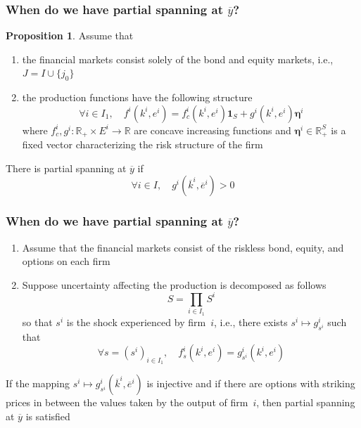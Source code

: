 \documentclass[blue]{beamer}
\def\R{\mathbb{R}}
\def\1{\mathbf{1}}
\theoremstyle{definition}
\theoremstyle{example}
\newtheorem*{proposition}{Proposition}
\begin{document}

\begin{frame}\frametitle{When do we have partial spanning at $\overline{y}$?}

\begin{proposition}
Assume that
\begin{enumerate}
\item the financial markets consist solely of the bond and equity markets, i.e., $J= I \cup \{j_0\}$
\item the production functions have the following structure
\[
\forall i\in I_1, \quad f^i(k^i,e^i) = f^i_c(k^i,e^i) \1_S + g^i(k^i,e^i) \bm{\eta}^i
\]
where $f^i_c,g^i: \R_+ \times E^i \to \R$ are concave increasing functions and $\bm{\eta}^i \in \R^S_+$ is a fixed vector characterizing the risk structure of the firm
\end{enumerate}
There is partial spanning at $\overline{y}$ if
\[
\forall i\in I, \quad g^i(\overline{k}^i,\overline{e}^i) >0
\]
\end{proposition}

\end{frame}


\begin{frame}\frametitle{When do we have partial spanning at $\overline{y}$?}

\begin{enumerate}
\item Assume that the financial markets consist of the riskless bond, equity, and options on each firm
\item Suppose uncertainty affecting the production is decomposed as follows
\[
S =\prod_{i\in I_1} S^i
\]
so that $s^i$ is the shock experienced by firm~$i$, i.e., there exists $s^i \mapsto g^i_{s^i}$ such that
\[
\forall s=(s^i)_{i\in I_1}, \quad f^i_s(k^i,e^i) = g^i_{s^i}(k^i,e^i)
\]
\end{enumerate}
If the mapping $s^i \mapsto g^i_{s^i}(\overline{k}^i,\overline{e}^i)$ is injective and if there are options with striking prices in between the values taken by the output of firm~$i$, then partial spanning at
$\overline{y}$ is satisfied

\end{frame}

\end{document}
